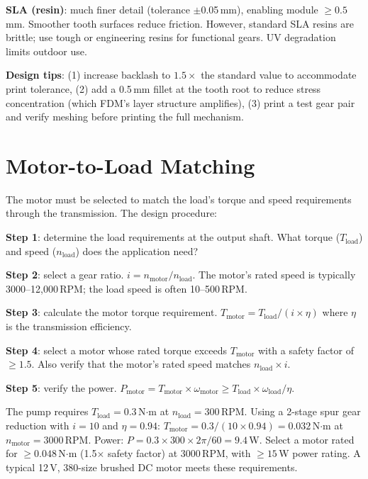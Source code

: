 \textbf{SLA (resin)}: much finer detail (tolerance $\pm$0.05\,mm), enabling module $\geq 0.5$\,mm. Smoother tooth surfaces reduce friction. However, standard SLA resins are brittle; use tough or engineering resins for functional gears. UV degradation limits outdoor use.

\textbf{Design tips}: (1) increase backlash to $1.5\times$ the standard value to accommodate print tolerance, (2) add a 0.5\,mm fillet at the tooth root to reduce stress concentration (which FDM's layer structure amplifies), (3) print a test gear pair and verify meshing before printing the full mechanism.

\section{Motor-to-Load Matching}
The motor must be selected to match the load's torque and speed requirements through the transmission. The design procedure:

\textbf{Step 1}: determine the load requirements at the output shaft. What torque ($T_{\text{load}}$) and speed ($n_{\text{load}}$) does the application need?

\textbf{Step 2}: select a gear ratio. $i = n_{\text{motor}}/n_{\text{load}}$. The motor's rated speed is typically 3000--12{,}000\,RPM; the load speed is often 10--500\,RPM.

\textbf{Step 3}: calculate the motor torque requirement. $T_{\text{motor}} = T_{\text{load}} / (i \times \eta)$ where $\eta$ is the transmission efficiency.

\textbf{Step 4}: select a motor whose rated torque exceeds $T_{\text{motor}}$ with a safety factor of $\geq 1.5$. Also verify that the motor's rated speed matches $n_{\text{load}} \times i$.

\textbf{Step 5}: verify the power. $P_{\text{motor}} = T_{\text{motor}} \times \omega_{\text{motor}} \geq T_{\text{load}} \times \omega_{\text{load}} / \eta$.

\begin{greenshieldbox}
The pump requires $T_{\text{load}} = 0.3$\,N$\cdot$m at $n_{\text{load}} = 300$\,RPM. Using a 2-stage spur gear reduction with $i = 10$ and $\eta = 0.94$: $T_{\text{motor}} = 0.3/(10 \times 0.94) = 0.032$\,N$\cdot$m at $n_{\text{motor}} = 3000$\,RPM. Power: $P = 0.3 \times 300 \times 2\pi/60 = 9.4$\,W. Select a motor rated for $\geq 0.048$\,N$\cdot$m (1.5$\times$ safety factor) at 3000\,RPM, with $\geq 15$\,W power rating. A typical 12\,V, 380-size brushed DC motor meets these requirements.
\end{greenshieldbox}

